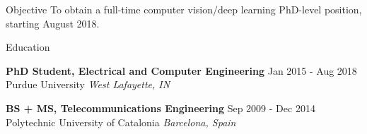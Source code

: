 \documentclass{resume} %
\begin{document}

\begin{rSection}{Objective}
To obtain a full-time computer vision/deep learning PhD-level position, starting August 2018.

\end{rSection}

\begin{rSection}{Education}

{\bf PhD Student, Electrical and Computer Engineering} \hfill {Jan 2015 - Aug 2018} \\
Purdue University \hfill {\em West Lafayette, IN\\}


{\bf BS + MS, Telecommunications Engineering} \hfill {Sep 2009 - Dec 2014} \\ 
Polytechnic University of Catalonia \hfill {\em Barcelona, Spain}

\vspace{5pt}

\end{rSection}

\end{document}
